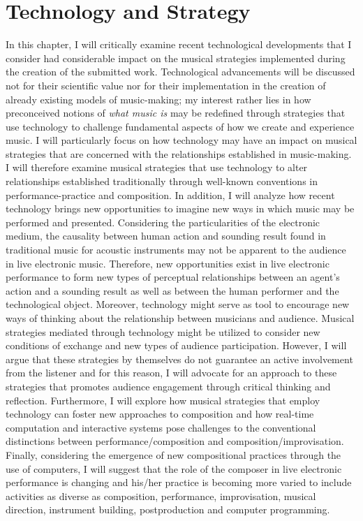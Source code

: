 \hypertarget{chapter3}{}
\chapter{Technology and Strategy}

In this chapter, I will critically examine recent technological developments that I consider had considerable impact on the musical strategies implemented during the creation of the submitted work. Technological advancements will be discussed not for their scientific value nor for their implementation in the creation of already existing models of music-making; my interest rather lies in how preconceived notions of \emph{what music is} may be redefined through strategies that use technology to challenge fundamental aspects of how we create and experience music. I will particularly focus on how technology may have an impact on musical strategies that are concerned with the relationships established in music-making. I will therefore examine musical strategies that use technology to alter relationships established traditionally through well-known conventions in performance-practice and composition. In addition, I will analyze how recent technology brings new opportunities to imagine new ways in which music may be performed and presented. Considering the particularities of the electronic medium, the causality between human action and sounding result found in traditional music for acoustic instruments may not be apparent to the audience in live electronic music. Therefore, new opportunities exist in live electronic performance to form new types of perceptual relationships between an agent's action and a sounding result as well as between the human performer and the technological object. Moreover, technology might serve as tool to encourage new ways of thinking about the relationship between musicians and audience. Musical strategies mediated through technology might be utilized to consider new conditions of exchange and new types of audience participation. However, I will argue that these strategies by themselves do not guarantee an active involvement from the listener and for this reason, I will advocate for an approach to these strategies that promotes audience engagement through critical thinking and reflection. Furthermore, I will explore how musical strategies that employ technology can foster new approaches to composition and how real-time computation and interactive systems pose challenges to the conventional distinctions between performance/composition and composition/improvisation. Finally, considering the emergence of new compositional practices through the use of computers, I will suggest that the role of the composer in live electronic performance is changing and his/her practice is becoming more varied to include activities as diverse as composition, performance, improvisation, musical direction, instrument building, postproduction and computer programming.

